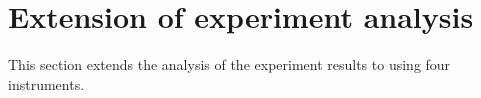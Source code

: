 %
%


\section{Extension of experiment analysis}\label{sec:expt_ext}
This section extends the analysis of the experiment results to using four instruments.

\setcounter{table}{0}
\renewcommand{\thetable}{D.\arabic{table}}

